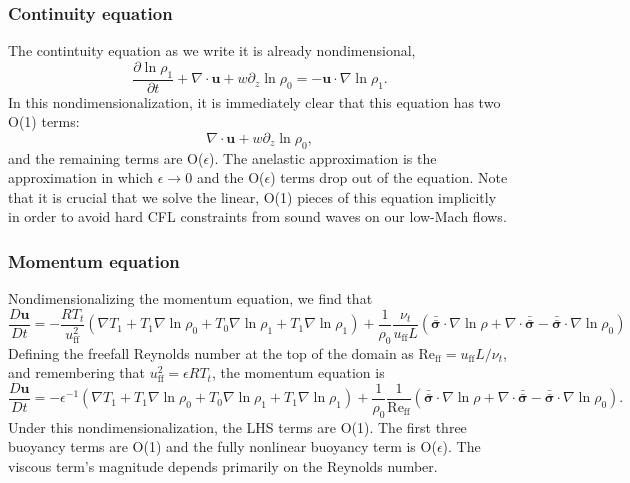 \documentclass[aps, pre, onecolumn, nofootinbib, notitlepage, groupedaddress, amsfonts, amssymb, amsmath, longbibliography, superscriptaddress]{revtex4-1}
\newcommand{\grad}{\ensuremath{\nabla}}
\newcommand{\lilstressT}{\ensuremath{\bm{\bar{\bar{\sigma}}}}}
\begin{document}
\subsubsection{Continuity equation}
The contintuity equation as we write it is already nondimensional,
\begin{equation}
\frac{\partial \ln\rho_1}{\partial t} + \grad\cdot\bm{u} + w\partial_z \ln\rho_0 = -\bm{u}\cdot\grad\ln\rho_1.
\end{equation}
In this nondimensionalization, it is immediately clear that this equation has two O(1) terms:
$$
\grad\cdot\bm{u} + w\partial_z \ln\rho_0,
$$
and the remaining terms are O($\epsilon$).
The anelastic approximation is the approximation in which $\epsilon \rightarrow 0$ and the O($\epsilon$) terms drop out of the equation.
Note that it is crucial that we solve the linear, O(1) pieces of this equation implicitly in order to avoid hard CFL constraints from sound waves on our low-Mach flows.

\subsubsection{Momentum equation}
Nondimensionalizing the momentum equation, we find that
\begin{equation}
\frac{D \bm{u}}{D t} = -\frac{ R T_t }{u_{\text{ff}}^2}\left(\grad T_1 + T_1\grad\ln\rho_0 + T_0 \grad\ln\rho_1 + T_1\grad\ln\rho_1\right)
+ \frac{1}{\rho_0}\frac{\nu_t}{u_{\text{ff}} L} \left(\lilstressT\cdot\grad\ln\rho + \grad\cdot\lilstressT - \lilstressT\cdot\grad\ln\rho_0\right)
\end{equation}
Defining the freefall Reynolds number at the top of the domain as $\text{Re}_{\text{ff}} = u_{\text{ff}} L / \nu_t$, and remembering that $u_{\text{ff}}^2 = \epsilon R T_t$, the momentum equation is
\begin{equation}
\frac{D \bm{u}}{D t} = -\epsilon^{-1}\left(\grad T_1 + T_1\grad\ln\rho_0 + T_0 \grad\ln\rho_1 + T_1\grad\ln\rho_1\right)
+ \frac{1}{\rho_0}\frac{1}{\text{Re}_{\text{ff}}} \left(\lilstressT\cdot\grad\ln\rho + \grad\cdot\lilstressT - \lilstressT\cdot\grad\ln\rho_0\right).
\end{equation}
Under this nondimensionalization, the LHS terms are O(1).
The first three buoyancy terms are O(1) and the fully nonlinear buoyancy term is O($\epsilon$).
The viscous term's magnitude depends primarily on the Reynolds number.
\end{document}
